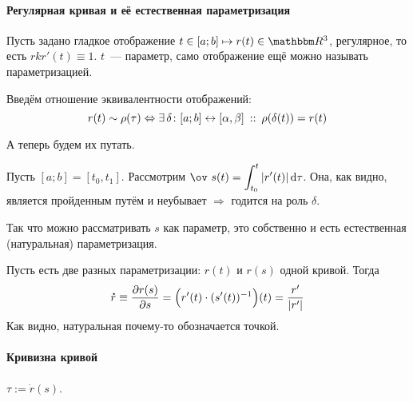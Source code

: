 \documentclass[12pt,timbord]{longnotes}
\begin{document}
\paragraph{Регулярная кривая и её естественная параметризация}
\label{par:dg::curve}

\begin{defn}\label{defn:dg::curve::map}
  Пусть задано гладкое отображение $t\in [a;b] \mapsto r(t) \in \R^3$, регулярное, то есть
  $rk r'(t) \equiv 1$. $t$~--- параметр, само отображение ещё можно
  называть параметризацией.

\end{defn}

\begin{defn}\label{defn:dg::curve::class}
  Введём отношение эквивалентности отображений:
  \[
    r(t) \sim \rho(\tau) \Leftrightarrow 
    \exists\, \delta \colon [a;b] \leftrightarrow [\alpha, \beta ] \:::\: \rho (\delta (t)) = r(t)
  \]
\end{defn}

А теперь будем их путать. \flame

\begin{defn}\label{defn:dg::curve::nat}
  Пусть $[a;b] = [t_0, t_1]$.
  Рассмотрим $\ov~s(t) = \dint_{t_0}^t | r'(t) | \, \del \tau $. Она, как видно, является 
  пройденным путём и неубывает  $ \Rightarrow $ годится на роль $\delta$.

  Так что можно рассматривать $s$ как параметр,  это собственно и есть
  естественная (натуральная) параметризация.
\end{defn}


\begin{prop}\label{prop:dg::curve::repar}
  Пусть есть две разных параметризации: $r(t)$ и $r(s)$ одной кривой. Тогда 
  \[
    \accentset{\mbox{\bfseries .}}{r} \equiv \frac{\partial r(s)}{\partial s} = \Bigl(r'(t) \cdot (s'(t))^{-1}\Bigr)(t) = \frac{r'}{|r'|} 
  \]
  Как видно, натуральная почему-то обозначается точкой.
\end{prop}

\paragraph{Кривизна кривой}
\label{par:dg::curvature}

\begin{defn}\label{defn:dg::curvature::tang}
  $\tau := \dot r(s)$.
\end{defn}
\end{document}
